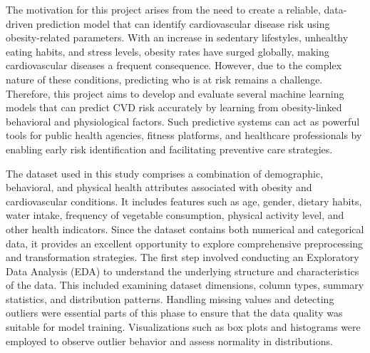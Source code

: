 The motivation for this project arises from the need to create a reliable, data-driven prediction model that can identify cardiovascular disease risk using obesity-related parameters.
With an increase in sedentary lifestyles, unhealthy eating habits, and stress levels, obesity rates have surged globally, making cardiovascular diseases a frequent consequence.
However, due to the complex nature of these conditions, predicting who is at risk remains a challenge.
Therefore, this project aims to develop and evaluate several machine learning models that can predict CVD risk accurately by learning from obesity-linked behavioral and physiological factors.
Such predictive systems can act as powerful tools for public health agencies, fitness platforms, and healthcare professionals by enabling early risk identification and facilitating preventive care strategies.

The dataset used in this study comprises a combination of demographic, behavioral, and physical health attributes associated with obesity and cardiovascular conditions.
It includes features such as age, gender, dietary habits, water intake, frequency of vegetable consumption, physical activity level, and other health indicators.
Since the dataset contains both numerical and categorical data, it provides an excellent opportunity to explore comprehensive preprocessing and transformation strategies.
The first step involved conducting an Exploratory Data Analysis (EDA) to understand the underlying structure and characteristics of the data.
This included examining dataset dimensions, column types, summary statistics, and distribution patterns.
Handling missing values and detecting outliers were essential parts of this phase to ensure that the data quality was suitable for model training.
Visualizations such as box plots and histograms were employed to observe outlier behavior and assess normality in distributions.

